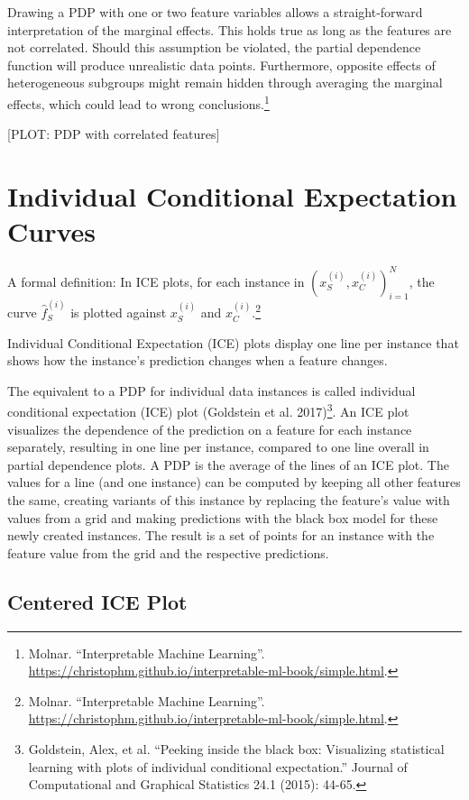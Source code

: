 \documentclass[]{krantz}
\begin{document}
Drawing a PDP with one or two feature variables allows a
straight-forward interpretation of the marginal effects. This holds true
as long as the features are not correlated. Should this assumption be
violated, the partial dependence function will produce unrealistic data
points. Furthermore, opposite effects of heterogeneous subgroups might
remain hidden through averaging the marginal effects, which could lead
to wrong conclusions.\footnote{Molnar. ``Interpretable Machine
  Learning''.
  \url{https://christophm.github.io/interpretable-ml-book/simple.html}.}

{[}PLOT: PDP with correlated features{]}

\section{Individual Conditional Expectation
Curves}\label{individual-conditional-expectation-curves}

A formal definition: In ICE plots, for each instance in
\({(x^{(i)}_S, x^{(i)}_C)}^N_{i=1}\), the curve \(\hat{f}_S^{(i)}\) is
plotted against \(x^{(i)}_S\) and \(x^{(i)}_C\).\footnote{Molnar.
  ``Interpretable Machine Learning''.
  \url{https://christophm.github.io/interpretable-ml-book/simple.html}.}

Individual Conditional Expectation (ICE) plots display one line per
instance that shows how the instance's prediction changes when a feature
changes.

The equivalent to a PDP for individual data instances is called
individual conditional expectation (ICE) plot (Goldstein et al.
2017)\footnote{Goldstein, Alex, et al. ``Peeking inside the black box:
  Visualizing statistical learning with plots of individual conditional
  expectation.'' Journal of Computational and Graphical Statistics 24.1
  (2015): 44-65.}. An ICE plot visualizes the dependence of the
prediction on a feature for each instance separately, resulting in one
line per instance, compared to one line overall in partial dependence
plots. A PDP is the average of the lines of an ICE plot. The values for
a line (and one instance) can be computed by keeping all other features
the same, creating variants of this instance by replacing the feature's
value with values from a grid and making predictions with the black box
model for these newly created instances. The result is a set of points
for an instance with the feature value from the grid and the respective
predictions.

\subsection{Centered ICE Plot}\label{centered-ice-plot}
\end{document}
